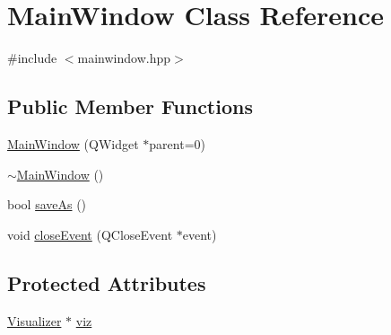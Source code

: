\hypertarget{class_main_window}{
\section{MainWindow Class Reference}
\label{class_main_window}
}


{\ttfamily \#include $<$mainwindow.hpp$>$}

\subsection*{Public Member Functions}
\begin{DoxyCompactItemize}
\item 
\hyperlink{class_main_window_a8b244be8b7b7db1b08de2a2acb9409db}{MainWindow} (QWidget $\ast$parent=0)
\item 
\hyperlink{class_main_window_ae98d00a93bc118200eeef9f9bba1dba7}{$\sim$MainWindow} ()
\item 
bool \hyperlink{class_main_window_a29cf7bd0dd9c5ab61fe788a54953cc63}{saveAs} ()
\item 
void \hyperlink{class_main_window_a4e20a4a065fbb0e4d3532a45a0a91425}{closeEvent} (QCloseEvent $\ast$event)
\end{DoxyCompactItemize}
\subsection*{Protected Attributes}
\begin{DoxyCompactItemize}
\item 
\hyperlink{class_visualizer}{Visualizer} $\ast$ \hyperlink{class_main_window_a696d13650a4ba5aa28b1c920009b577f}{viz}
\end{DoxyCompactItemize}


